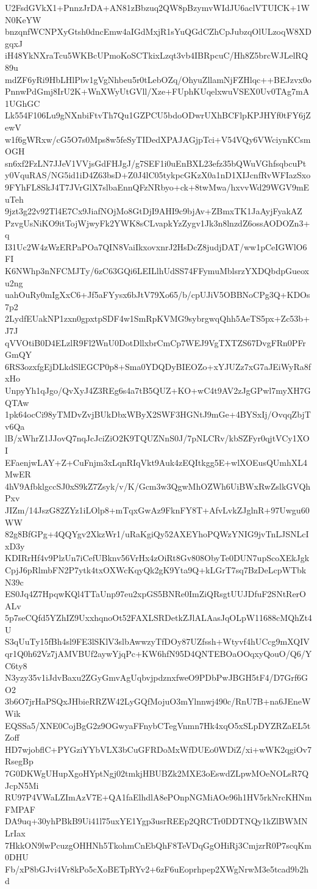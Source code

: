 U2FsdGVkX1+PnnzJrDA+AN81zBbzuq2QW8pBzymvWIdJU6aclVTUICK+1WN0KeYW
bnzqnfWCNPXyGtsh0dncEmw4aIGdMxjR1sYuQGdCZhCpJubzqOlULzoqW8XDgqxJ
iH48YkNXraTcu5WKBcUPmoKoSCTkixLzqt3vb4IBRpcuC/Hh8Z5brcWJLelRQ89u
mdZF6yRi9HbLHlPbv1gVgNhbeu5r0tLebOZq/OhyuZllamNjFZHlqc++BEJzvx0o
PnnwPdGmj8IrU2K+WnXWyUtGVll/Xze+FUphKUqelxwuVSEX0Uv0TAg7mA1UGhGC
Lk554F106Lu9gNXnbiFtvTh7Qu1GZPCU5bdoODwrUXhBCFlpKPJHYf0tFY6jZewV
w1f6gWRxw/cG5O7s0Mps8w5feSyTIDedXPAJAGjpTci+V54VQy6VWciynKCsmOGH
sn6xf2FzLN7JJeV1VVjsGdFHJgJ/g7SEF1i0uEnBXL23efz35bQWuVGhfsqbcuPt
y0VquRAS/NG5id1iD4Z63bsD+Z0J4lC05tykpcGKzX0a1nD1XIJcnfRvWFIazSxo
9FYhFL8SkJ4T7JVrGlX7slbaEnnQFzNRbyo+ck+8twMwa/hxvvWd29WGV9mEuTeh
9jzt3g22v92Tl4E7Cx9JiafNOjMo8GtDjI9AHI9c9bjAv+ZBmxTK1JaAyjFyakAZ
PzvgUsNiKO9itTojWjwyFk2YWK8sCLvapkYzZygv1Jk3n8lnzdZ6ossAODOZn3+q
I31Uc2W4zWzERPaPOa7QIN8VaiIkxovxnrJ2HsDcZ8judjDAT/ww1pCeIGWlO6FI
K6NWhp3nNFCMJTy/6zC63GQi6LEILlhUdSS74FFymuMblsrzYXDQbdpGueoxu2ng
uahOuRy0mIgXxC6+Jf5aFYysx6bJtV79Xo65/b/cpUJiV5OBBNoCPg3Q+KDOs7p2
2LydfEUakNP1zxn0gpxtpSDF4w1SmRpKVMG9sybrgwqQhh5AeTS5px+Zc53b+J7J
qVVOtiB0D4ELzlR9Fl2WnU0DotDllxbrCmCp7WEJ9VgTXTZS67DvgFRn0PFrGmQY
6RS3ozxfgEjDLkdSlEGCP0p8+Sma0YDQDyBIEOZo+xYJUZz7xG7aJEiWyRa8fxHo
UnpyYh1qJgo/QvXyJ4Z3REg6s4a7tB5QUZ+KO+wC4t9AV2zJgGPwl7myXH7GQTAw
1pk64ocCi98yTMDvZvjBUkDbxWByX2SWF3HGNtJ9mGe+4BYSxIj/OvqqZbjTv6Qa
lB/xWhrZ1JJovQ7nqJcJciZiO2K9TQUZNnS0J/7pNLCRv/kbSZFyr0qjtVCy1XOI
EFaenjwLAY+Z+CuFnjm3xLqnRIqVkt9Auk4zEQItkgg5E+wlXOEusQUmhXL4MwER
4hV9AfbklgccSJ0xS9kZ7Zsyk/v/K/Gcm3w3QgwMhOZWh6UiBWxRwZslkGVQhPxv
JIZm/14JszG82ZYz1iLOlp8+mTqxGwAz9FknFY8T+AfvLvkZJglnR+97Uwgu60WW
82g8BfGPg+4QQYgv2XkzWr1/uRaKgiQy52AXEYhoPQWzYNIG9jvTnLJSNLcIxD3y
KDIRrHf4v9PlzUn7iCefUBknv56VrHx4zOiRt8Gv808ObyTe0DUN7upScoXEkJgk
CpjJ6pRlmbFN2P7ytk4txOXWcKqyQk2gK9Yta9Q+kLGrT7sq7BzDeLcpWTbkN39c
ES0Jq4Z7HpqwKQl4TTaUnp97eu2xpGS5BNRe0ImZiQRsgtUUJDfuF2SNtRerOALv
5p7seCQfd5YZhIZ9UxxhqnoOt52FAXLSRDetkZJlALAasJqOLpW11688cMQhZt4U
S3qUuTy15fBh4sl9FE3lSKlV3slbAwwzyTfDOy87UZfssh+Wtyvf4hUCcg9mXQIV
qr1Q0h62Vz7jAMVBUf2aywYjqPc+KW6hfN95D4QNTEBOaOOqxyQouO/Q6/YC6ty8
N3yzy35v1iJdvBaxu2ZGyGmvAgUqbvjpdznxfweO9PDbPwJBGH5tF4/D7Grf6GO2
3b6O7jrHaPSQxJHbieRRZW42LyGQfMojuO3mYlnnwj490c/RnU7B+na6JEneWWik
EQSSa5/XNE0CojBgG2z9OGwyaFFnybCTegVnmn7Hk4xqO5xSLpDYZRZaEL5tZoff
HD7wjobflC+PYGziYYbVLX3bCuGFRDoMxWfDUEo0WDiZ/xi+wWK2qgiOv7RsegBp
7G0DKWgUHupXgoHYptNgj02tmkjHBUBZk2MXE3oEswdZLpwMOeNOLsR7QJcpN5Mi
RU97P4VWaLZImAzV7E+QA1faElhdlA8ePOnpNGMiAOe96h1HV5rkNrcKHNmFMPAF
DA9uq+30yhPBkB9Ui41l75uxYE1Ygp3usrREEp2QRCTr0DDTNQy1kZlBWMNLrIax
7HkkON9lwPcuzgOHHNh5TkohmCnEbQhF8TeVDqGgOHiRj3CmjzrR0P7scqKm0DHU
Fb/xP8bGJvi4Vr8kPo5cXoBETpRYv2+6zF6uEoprhpep2XWgNrwM3e5tcad9b2hd
